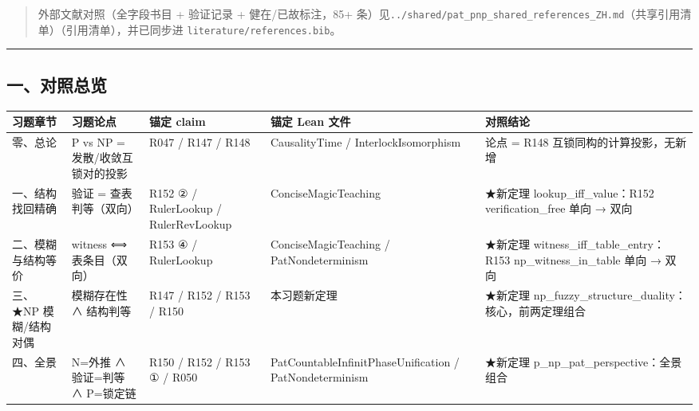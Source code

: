 \documentclass[
]{article}
\newcounter{none} %
\begin{document}
\begin{quote}
外部文献对照（全字段书目 + 验证记录 + 健在/已故标注，85+
条）见\texttt{../shared/pat\_pnp\_shared\_references\_ZH.md}（共享引用清单）（引用清单），并已同步进
\texttt{literature/references.bib}。
\end{quote}

\begin{center}\rule{0.5\linewidth}{0.5pt}\end{center}

\subsection{一、对照总览}\label{ux4e00ux5bf9ux7167ux603bux89c8}

{\def\LTcaptype{none} %
\begin{longtable}[]{@{}
  >{\raggedright\arraybackslash}p{}
  >{\raggedright\arraybackslash}p{}
  >{\raggedright\arraybackslash}p{}
  >{\raggedright\arraybackslash}p{}
  >{\raggedright\arraybackslash}p{}@{}}
\toprule\noalign{}
\begin{minipage}[b]{\linewidth}\raggedright
习题章节
\end{minipage} & \begin{minipage}[b]{\linewidth}\raggedright
习题论点
\end{minipage} & \begin{minipage}[b]{\linewidth}\raggedright
锚定 claim
\end{minipage} & \begin{minipage}[b]{\linewidth}\raggedright
锚定 Lean 文件
\end{minipage} & \begin{minipage}[b]{\linewidth}\raggedright
对照结论
\end{minipage} \\
\midrule\noalign{}
\endhead
\bottomrule\noalign{}
\endlastfoot
零、总论 & P vs NP = 发散/收敛互锁对的投影 & R047 / R147 / R148 &
CausalityTime / InterlockIsomorphism & 论点 = R148
互锁同构的计算投影，无新增 \\
一、结构找回精确 & 验证 = 查表判等（双向） & R152 ② / RulerLookup /
RulerRevLookup & ConciseMagicTeaching & ★新定理 lookup\_iff\_value：R152
verification\_free 单向 → 双向 \\
二、模糊与结构等价 & witness ⟺ 表条目（双向） & R153 ④ / RulerLookup &
ConciseMagicTeaching / PatNondeterminism & ★新定理
witness\_iff\_table\_entry：R153 np\_witness\_in\_table 单向 → 双向 \\
三、★NP 模糊/结构对偶 & 模糊存在性 ∧ 结构判等 & R147 / R152 / R153 /
R150 & 本习题新定理 & ★新定理
np\_fuzzy\_structure\_duality：核心，前两定理组合 \\
四、全景 & N=外推 ∧ 验证=判等 ∧ P=锁定链 & R150 / R152 / R153 ① / R050 &
PatCountableInfinitPhaseUnification / PatNondeterminism & ★新定理
p\_np\_pat\_perspective：全景组合 \\
\end{longtable}
}
\end{document}
